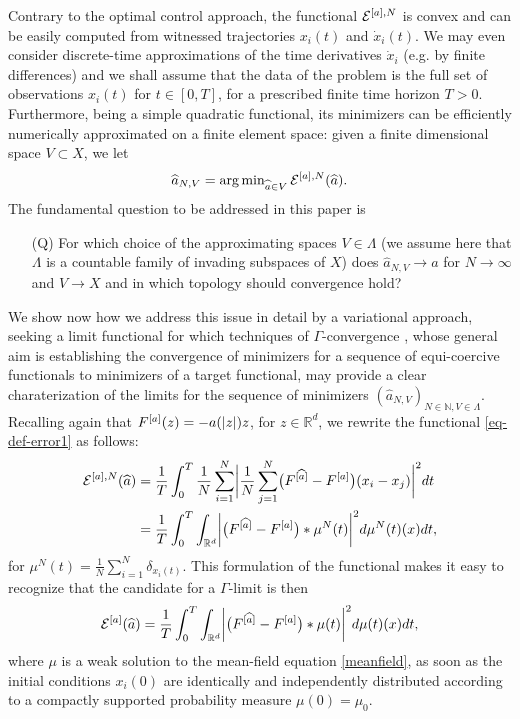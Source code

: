 Contrary to the optimal control approach, the functional $\mathcal E^{[a],N}$ is convex and can be easily computed from witnessed trajectories $x_i(t)$ and $\dot x_i(t)$. We may even consider discrete-time approximations of the time derivatives $\dot x_i$ (e.g. by finite differences) and we shall assume that the data of the problem is the full set of observations $x_i(t)$ for $t \in [0,T]$, for a prescribed finite time horizon $T>0$. Furthermore, being a simple quadratic functional, its minimizers can be efficiently numerically approximated on a finite element space: given a finite dimensional space $V \subset X$, we let
\begin{equation}\label{fdproxy}
\widehat a_{N,V} = \operatorname{arg\,min}_{\widehat a \in V} \mathcal E^{[a],N}(\widehat a).
\end{equation}
The fundamental question to be addressed in this paper is
\begin{itemize}
\item[(Q)] For which choice of the approximating spaces $V \in \Lambda$ (we assume here that $\Lambda$ is a countable family of invading subspaces of $X$) does $\widehat a_{N,V} \to a$ for $N \to \infty$ and $V \to X$ and in which topology should convergence hold?
\end{itemize}
We show now how we address this issue in detail by a variational approach, seeking a limit functional for which techniques of $\Gamma$-convergence \cite{MR1201152}, whose general aim is establishing the convergence of minimizers for a sequence of equi-coercive functionals to minimizers of a target functional, may provide a clear charaterization of the limits for the sequence of minimizers $(\widehat a_{N,V})_{N \in \mathbb N, V \in \Lambda}$.
Recalling again that $F^{[a]}(z) =-a(| z |)z$, for $z \in \mathbb R^{d}$, we rewrite the functional \eqref{eq-def-error1} as follows:
\begin{align}\label{pirlo}
	\begin{split}
	\mathcal E^{[a],N}(\widehat a) & = \frac{1}{T}\int_0^T\frac{1}{N}\sum_{i=1}^N\biggl|\frac{1}{N}\sum_{j=1}^N
			\bigl(F^{[\widehat a]}-F^{[a]}\bigr)(x_i-x_j)\biggr|^2 dt\\
			& = \frac{1}{T}\int_0^T \int_{\mathbb{R}^d} \biggl|\bigl(F^{[\widehat a]}-F^{[a]}\bigr)\ast\mu^N(t)\biggr|^2d\mu^N(t)(x)dt,
	\end{split}
\end{align}
for $\mu^N(t) = \frac{1}{N}\sum^N_{i = 1} \delta_ {x_i(t)}$.
This formulation of the functional makes it easy to recognize that the candidate for a $\Gamma$-limit  is then
\begin{align}\label{ourfunctional}
	\mathcal E^{[a]}(\widehat a)=\frac{1}{T}\int_0^T \int_{\mathbb{R}^d} \biggl|\bigl(F^{[\widehat a]}-F^{[a]}\bigr)\ast\mu(t)\biggr|^2d\mu(t)(x)dt,
\end{align}
where $\mu$ is a weak solution to the mean-field equation \eqref{meanfield}, as soon as the initial conditions $x_i(0)$ are identically and independently 
distributed according to a compactly supported probability measure $\mu(0)=\mu_0$. 

